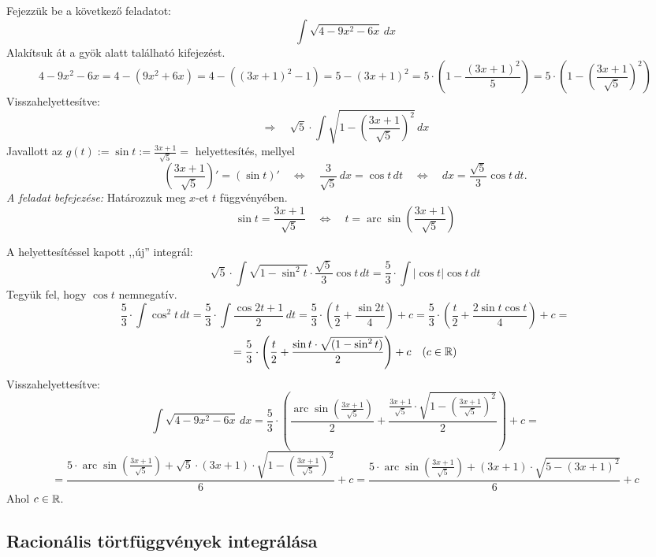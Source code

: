 \documentclass[a4paper,11.5pt]{article}
\DeclareMathOperator{\arc}{arc}
\begin{document}
	\begin{exercise}
		Fejezzük be a következő feladatot:
		\[ \int\sqrt{4-9x^2-6x}\,dx%
		\]
		Alakítsuk át a gyök alatt található kifejezést.
		\[ 4-9x^2-6x=4-(9x^2+6x)=4-((3x+1)^2-1)=5-(3x+1)^2=5\cdot\left(1-\frac{(3x+1)^2}{5}\right)=5\cdot\left(1-\left(\frac{3x+1}{\sqrt{5}}\right)^2\right)\]
		Visszahelyettesítve:
		\[\Rightarrow\quad \sqrt{5}\cdot\int\sqrt{1-\left(\frac{3x+1}{\sqrt{5}}\right)^2}\,dx \]
		Javallott az $\displaystyle g(t):=\sin t:=\frac{3x+1}{\sqrt{5}}=$ helyettesítés, mellyel
		\[ \left(\frac{3x+1}{\sqrt{5}}\right)'=(\sin t)'\quad  \Leftrightarrow\quad \frac{3}{\sqrt{5}}\,dx=\cos t\,dt\quad \Leftrightarrow\quad dx=\frac{\sqrt{5}}{3}\cos t\,dt. \]
		\textit{A feladat befejezése:}	Határozzuk meg $x$-et $t$ függvényében.
		\[ \sin t=\frac{3x+1}{\sqrt 5}\quad \Leftrightarrow\quad t = \arc\sin\left(\frac{3x+1}{\sqrt{5}}\right) \]
		
		A helyettesítéssel kapott ,,új'' integrál:
		\[ \sqrt{5}\cdot\int\sqrt{1-\sin^2t}\cdot\frac{\sqrt{5}}{3}\cos t\,dt=\frac{5}{3}\cdot\int|\cos t|\cos t\,dt\]
		Tegyük fel, hogy $\cos t$ nemnegatív.
		\[ \frac{5}{3}\cdot\int\cos^2 t\,dt=\frac{5}{3}\cdot\int\frac{\cos2t+1}{2}\,dt=\frac{5}{3}\cdot\left(\frac{t}{2}+\frac{\sin2t}{4}\right)+c=\frac{5}{3}\cdot\left(\frac{t}{2}+\frac{2\sin t\cos t}{4}\right)+c= \]
		\[ =\frac{5}{3}\cdot\left(\frac{t}{2}+\frac{\sin t\cdot\sqrt{(1-\sin^2t)}}{2}\right)+c \quad (c\in\mathbb{R})\]
		Visszahelyettesítve:
		\[ \int\sqrt{4-9x^2-6x}\,dx=\frac{5}{3}\cdot\left(\frac{\arc\sin\left(\frac{3x+1}{\sqrt 5}\right)}{2}+\frac{\frac{3x+1}{\sqrt{5}}\cdot\sqrt{1-\left(\frac{3x+1}{\sqrt{5}}\right)^2}}{2}\right)+c=\]
		\[ =\frac{5\cdot\arc\sin\left(\frac{3x+1}{\sqrt 5}\right)+\sqrt{5}\cdot(3x+1)\cdot\sqrt{1-\left(\frac{3x+1}{\sqrt{5}}\right)^2}}{6}+c=\frac{5\cdot\arc\sin\left(\frac{3x+1}{\sqrt 5}\right)+(3x+1)\cdot\sqrt{5-(3x+1)^2}}{6}+c \]
		Ahol $c\in\mathbb{R}$.
	\end{exercise}
	\subsection{Racionális törtfüggvények integrálása}
\end{document}

